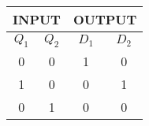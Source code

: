 \begin{tabular}[h]{|c|c|c|c|}
\hline \multicolumn{2}{|c|}{INPUT} & \multicolumn{2}{|c|}{OUTPUT} \\
\hline $Q_1$ & $Q_2$ & $D_1$ & $D_2$ \\
\hline 0 & 0 & 1 & 0 \\
\hline 1 & 0 & 0 & 1 \\
\hline 0 & 1 & 0 & 0 \\
\hline
\end{tabular}
